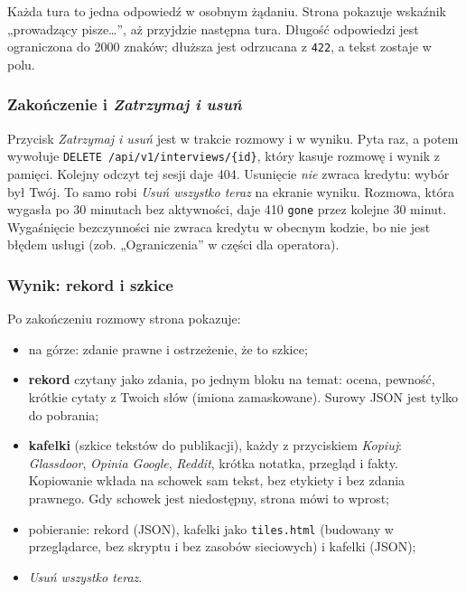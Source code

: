{Każda tura to jedna odpowiedź w osobnym żądaniu. Strona pokazuje wskaźnik
„prowadzący pisze…”, aż przyjdzie następna tura. Długość odpowiedzi jest
ograniczona do 2000 znaków; dłuższa jest odrzucana z \texttt{422}, a tekst
zostaje w polu.

\subsubsection{Zakończenie i \emph{Zatrzymaj i usuń}}

Przycisk \emph{Zatrzymaj i usuń} jest w trakcie rozmowy i w wyniku. Pyta raz, a
potem wywołuje \texttt{DELETE /api/v1/interviews/\{id\}}, który kasuje rozmowę
i wynik z pamięci. Kolejny odczyt tej sesji daje 404. Usunięcie \emph{nie}
zwraca kredytu: wybór był Twój. To samo robi \emph{Usuń wszystko teraz} na
ekranie wyniku. Rozmowa, która wygasła po 30 minutach bez aktywności, daje
410 \texttt{gone} przez kolejne 30 minut. Wygaśnięcie bezczynności nie zwraca
kredytu w obecnym kodzie, bo nie jest błędem usługi (zob. „Ograniczenia” w
części dla operatora).

\subsubsection{Wynik: rekord i szkice}

Po zakończeniu rozmowy strona pokazuje:

\begin{itemize}[leftmargin=*,itemsep=2pt]
  \item na górze: zdanie prawne i ostrzeżenie, że to szkice;
  \item \textbf{rekord} czytany jako zdania, po jednym bloku na temat: ocena,
        pewność, krótkie cytaty z Twoich słów (imiona zamaskowane). Surowy JSON
        jest tylko do pobrania;
  \item \textbf{kafelki} (szkice tekstów do publikacji), każdy z przyciskiem
        \emph{Kopiuj}: \emph{Glassdoor}, \emph{Opinia Google}, \emph{Reddit},
        krótka notatka, przegląd i fakty. Kopiowanie wkłada na schowek sam tekst,
        bez etykiety i bez zdania prawnego. Gdy schowek jest niedostępny, strona
        mówi to wprost;
  \item pobieranie: rekord (JSON), kafelki jako \texttt{tiles.html} (budowany
        w przeglądarce, bez skryptu i bez zasobów sieciowych) i kafelki (JSON);
  \item \emph{Usuń wszystko teraz}.
\end{itemize}

}
